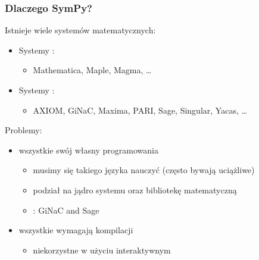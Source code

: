 \documentclass[10pt]{beamer}
\begin{document}
\begin{frame}[fragile]
    \frametitle{Dlaczego SymPy?}

    Istnieje wiele systemów matematycznych:
    \begin{itemize}
        \item Systemy :
            \begin{itemize}
                \item Mathematica, Maple, Magma, \ldots
            \end{itemize}
        \item Systemy :
            \begin{itemize}
                \item AXIOM, GiNaC, Maxima, PARI, Sage, Singular, Yacas, \ldots
            \end{itemize}
    \end{itemize}
    \pause
    {\color{red} Problemy:}
    \begin{itemize}
        \item wszystkie  swój własny  programowania
            \begin{itemize}
                \item musimy się takiego języka nauczyć (często bywają uciążliwe)
                \item podział na jądro systemu oraz bibliotekę matematyczną
                \item {}: GiNaC and Sage
            \end{itemize}
        \pause
        \item wszystkie wymagają kompilacji
            \begin{itemize}
                \item niekorzystne w użyciu interaktywnym
            \end{itemize}
    \end{itemize}
\end{frame}
\end{document}
